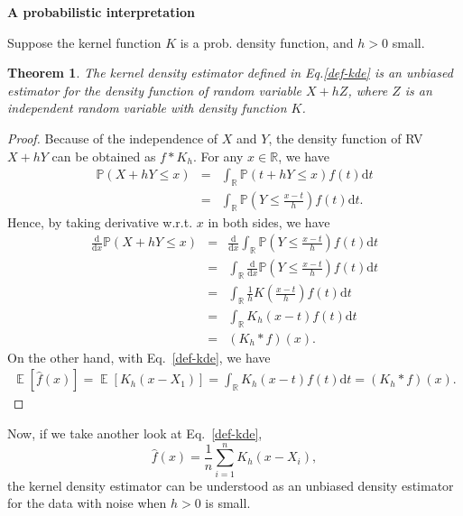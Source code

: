 \documentclass[19pt,landscape]{article}
\newtheorem{thm}{Theorem}%
\newcommand{\IP}{\mathbb{P}}
\DeclareMathOperator{\E}{\mathbb{E}}
\newcommand{\R}{\mathbb{R}}
\begin{document}
\newpage
{\LARGE\centerline{\textbf{A probabilistic interpretation}}}
\vskip25pt
\large
\noindent
Suppose the kernel function $K$ is a prob. density function, and $h>0$ small. 
 \vskip 5pt
 \begin{thm}
    The kernel density estimator defined in Eq.\eqref{def-kde} is an unbiased estimator for the density function of random variable $X+hZ$, where $Z$ is an independent random variable with density function $K$.
 \end{thm}
 \begin{proof}
    Because of the independence of $X$ and $Y$, the density function of RV $X+hY$ can be obtained as $f*K_h$.  
    For any $x\in\R$, we have
    \begin{eqnarray}
        \IP(X+hY\le x)&=&\int_{\R}\IP(t+hY\le x)f(t)\mathrm{d}t\nonumber\\
        &=&\int_{\R}\IP\left(Y\le \frac{x-t}h\right)f(t)\mathrm{d}t.
    \end{eqnarray}
    Hence, by taking derivative w.r.t. $x$ in both sides, we have
    \begin{eqnarray*}
        \frac{\mathrm{d}}{\mathrm{d}x}\IP(X+hY\le x)&=&\frac{\mathrm{d}}{\mathrm{d}x}\int_{\R}\IP\left(Y\le \frac{x-t}h\right)f(t)\mathrm{d}t\\
        &=&\int_{\R}\frac{\mathrm{d}}{\mathrm{d}x}\IP\left(Y\le \frac{x-t}h\right)f(t)\mathrm{d}t\\
        &=&\int_{\R}\frac1hK\left(\frac{x-t}h\right)f(t)\mathrm{d}t\\
        &=&\int_{\R}K_h(x-t)f(t)\mathrm{d}t\\
        &=&\left(K_h*f\right)(x). 
    \end{eqnarray*}
    On the other hand, with Eq.~\eqref{def-kde}, we have 
    \begin{eqnarray*}
        \E\left[\hat{f}(x)\right]=\E\left[K_h(x-X_1)\right]=\int_{\R}K_h(x-t)f(t)\mathrm{d}t=\left(K_h*f\right)(x).
    \end{eqnarray*}
 \end{proof}
 \noindent
Now, if we take another look at Eq.~\eqref{def-kde}, 
\begin{equation*}
    \hat{f}(x)=\frac1n\sum_{i=1}^nK_h(x-X_i), 
\end{equation*}
the kernel density estimator can be understood as an unbiased density estimator for the data with noise when $h>0$ is small.
\end{document}
